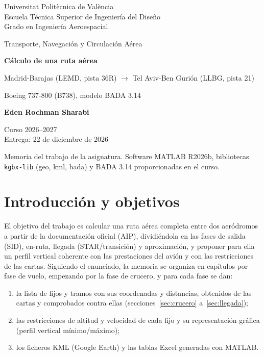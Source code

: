 \documentclass[11pt,a4paper]{article}
\begin{document}
\begin{titlepage}
\centering
{\large Universitat Politècnica de València\\ Escuela Técnica Superior de Ingeniería del Diseño\\[2mm] Grado en Ingeniería Aeroespacial\par}
\vspace{1.2cm}
{\Large Transporte, Navegación y Circulación Aérea\par}
\vspace{2.5cm}
{\LARGE\bfseries Cálculo de una ruta aérea\par}
\vspace{4mm}
{\Large Madrid-Barajas (LEMD, pista 36R) $\rightarrow$ Tel Aviv-Ben Gurión (LLBG, pista 21)\par}
\vspace{3mm}
{\large Boeing 737-800 (B738), modelo BADA 3.14\par}
\vspace{2.5cm}
{\large\bfseries Eden Rochman Sharabi\par}
\vspace{1cm}
{\large Curso 2026--2027\\ Entrega: 22 de diciembre de 2026\par}
\vfill
{\small Memoria del trabajo de la asignatura. Software MATLAB R2026b, bibliotecas \texttt{kgbx-lib} (geo, kml, bada) y BADA 3.14 proporcionadas en el curso.\par}
\end{titlepage}

\tableofcontents
\clearpage

\section{Introducción y objetivos}

El objetivo del trabajo es calcular una ruta aérea completa entre dos aeródromos a partir de la documentación oficial (AIP), dividiéndola en las fases de salida (SID), en-ruta, llegada (STAR/transición) y aproximación, y proponer para ella un perfil vertical coherente con las prestaciones del avión y con las restricciones de las cartas. Siguiendo el enunciado, la memoria se organiza en capítulos por fase de vuelo, empezando por la fase de crucero, y para cada fase se dan:

\begin{enumerate}
\item la lista de fijos y tramos con sus coordenadas y distancias, obtenidos de las cartas y comprobados contra ellas (secciones~\ref{sec:crucero} a~\ref{sec:llegada});
\item las restricciones de altitud y velocidad de cada fijo y su representación gráfica (perfil vertical mínimo/máximo);
\item los ficheros KML (Google Earth) y las tablas Excel generadas con MATLAB.
\end{enumerate}
\end{document}
